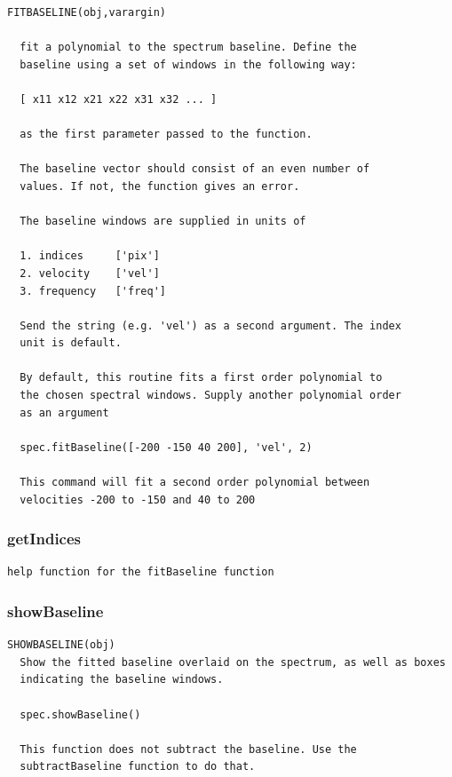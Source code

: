 \documentclass[11pt,a4paper]{article}
\begin{document}
\begin{lstlisting}[framerule=0pt]
  FITBASELINE(obj,varargin)
  
  fit a polynomial to the spectrum baseline. Define the
  baseline using a set of windows in the following way:
 
  [ x11 x12 x21 x22 x31 x32 ... ]
 
  as the first parameter passed to the function.
 
  The baseline vector should consist of an even number of
  values. If not, the function gives an error.
 
  The baseline windows are supplied in units of
 
  1. indices     ['pix']
  2. velocity    ['vel']
  3. frequency   ['freq']
 
  Send the string (e.g. 'vel') as a second argument. The index
  unit is default.
 
  By default, this routine fits a first order polynomial to
  the chosen spectral windows. Supply another polynomial order
  as an argument
 
  spec.fitBaseline([-200 -150 40 200], 'vel', 2)
  
  This command will fit a second order polynomial between
  velocities -200 to -150 and 40 to 200
\end{lstlisting}

\subsubsection*{getIndices}
\label{sec:getindices}

\begin{lstlisting}[framerule=0pt]
  help function for the fitBaseline function
\end{lstlisting}

\subsubsection*{showBaseline}
\label{sec:showbaseline}

\begin{lstlisting}[framerule=0pt]
  SHOWBASELINE(obj) 
  Show the fitted baseline overlaid on the spectrum, as well as boxes
  indicating the baseline windows. 
  
  spec.showBaseline() 
  
  This function does not subtract the baseline. Use the
  subtractBaseline function to do that.
\end{lstlisting}
\end{document}

